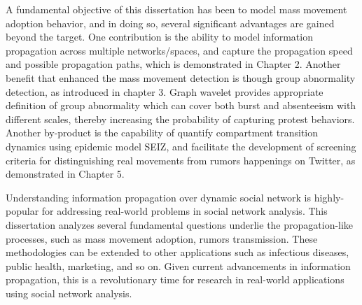 A fundamental objective of this dissertation has been to model mass movement adoption behavior, and in doing so, several significant advantages are gained beyond the target. One contribution is the ability to model information propagation across multiple networks/spaces, and capture the propagation speed and possible propagation paths, which is demonstrated in Chapter 2. Another benefit that enhanced the mass movement detection is though group abnormality detection, as introduced in chapter 3. Graph wavelet provides appropriate definition of group abnormality which can cover both burst and absenteeism with different scales, thereby increasing the probability of capturing protest behaviors. Another by-product is the capability of quantify compartment transition dynamics using epidemic model SEIZ, and facilitate the development of screening criteria for distinguishing real movements from rumors happenings on Twitter, as demonstrated in Chapter 5.

Understanding information propagation over dynamic social network is highly-popular for addressing real-world problems in social network analysis. This dissertation analyzes several fundamental questions underlie the propagation-like processes, such as mass movement adoption, rumors transmission. These methodologies can be extended to other applications such as infectious diseases, public health, marketing, and so on. Given current advancements in information propagation, this is a revolutionary time for research in real-world applications using social network analysis.





